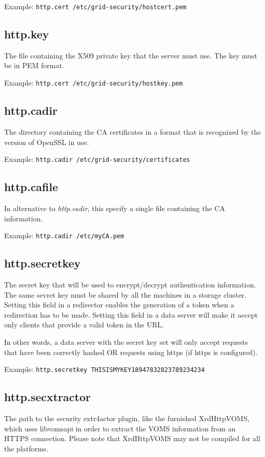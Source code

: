 \documentclass[12pt]{article} %
\begin{document}
Example:
\verb'http.cert /etc/grid-security/hostcert.pem'

\subsection{http.key}
The file containing the X509 private key that the server must use. The key must be in PEM format.

Example:
\verb'http.cert /etc/grid-security/hostkey.pem'

\subsection{http.cadir}
The directory containing the CA certificates in a format that is recognized by the version of OpenSSL in use.

Example:
\verb'http.cadir /etc/grid-security/certificates'

\subsection{http.cafile}
In alternative to \textit{http.cadir}, this specify a single file containing the CA information.

Example:
\verb'http.cadir /etc/myCA.pem'

\subsection{http.secretkey}
The secret key that will be used to encrypt/decrypt authentication information. The same sevret key must be shared by all the machines in a storage cluster.
Setting this field in a redirector enables the generation of a token when a redirection has to be made.
Setting this field in a data server will make it accept only clients that provide a valid token in the URL.

In other words, a data server with the secret key set will only accept requests that have been correctly hashed OR requests using https (if https is configured).

Example:
\verb'http.secretkey THISISMYKEY18947832823789234234'

\subsection{http.secxtractor}
The path to the security extr4actor plugin, like the furnished XrdHttpVOMS, which uses libvomsapi in order to
extract the VOMS information from an HTTPS connection. Please note that XrdHttpVOMS may not be compiled for all the platforms.
\end{document}
